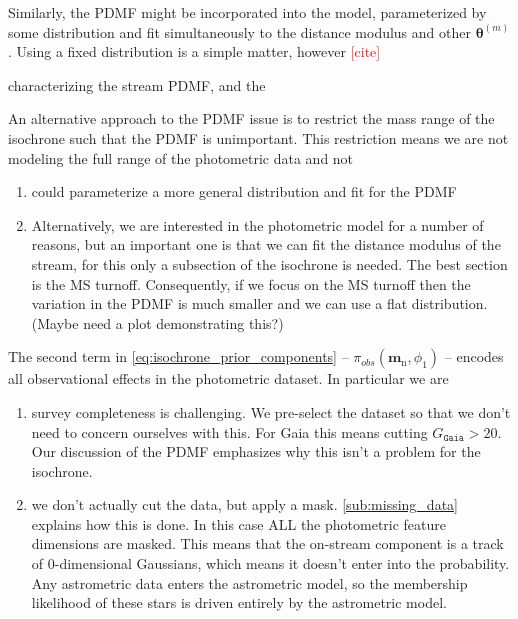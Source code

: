 \documentclass[twocolumn]{aastex631}
\newcommand{\dataarchive}[1]{\texttt{#1}}
\newcommand{\Gaia}{\dataarchive{Gaia}}
\newcommand{\mrm}[1]{\mathrm{#1}}
\newcommand{\mbs}[1]{\boldsymbol{#1}}
\newcommand{\mcal}[1]{\mathcal{#1}}
\newcommand{\prior}{\mcal{\pi}}
\newcommand{\nth}[1]{{#1}_{\mrm{n}}}  %
\newcommand{\smallcomponent}[2]{#2^{\scriptscriptstyle (#1)}}
\newcommand{\cmp}[2]{\smallcomponent{#1}{#2}}
\newcommand{\TODO}[1]{{\textcolor{red}{#1}}}
\begin{document}
            Similarly, the PDMF might be incorporated into the model,
            parameterized by some distribution and fit simultaneously to the distance modulus and other $\cmp{m}{\mbs{\theta}}$.
            Using a fixed distribution is a simple matter, however 
            \TODO{[cite]}
            
            characterizing the stream PDMF, and the 

            An alternative approach to the PDMF issue is to restrict the mass range of the isochrone such that the PDMF is unimportant.
            This restriction means we are not modeling the full range of the 
            photometric data and not

            \begin{enumerate}
                \item could parameterize a more general distribution and fit for the PDMF
                \item Alternatively, we are interested in the photometric model for a number of reasons, but an important one is that we can fit the distance modulus of the stream, for this only a subsection of the isochrone is needed. The best section is the MS turnoff.
                Consequently, if we focus on the MS turnoff then the variation in the PDMF is much smaller and we can use a flat distribution. (Maybe need a plot demonstrating this?)
            \end{enumerate}

            The second term in \autoref{eq:isochrone_prior_components} -- $\prior_{obs}(\nth{\mbs{m}}, \phi_1)$ -- encodes all observational effects in the photometric dataset. In particular we are
 
            \todo[inline]{discussion of the $\prior_{obs}(\nth{\mbs{m}}, \phi_1)$}

            \begin{enumerate}
                \item survey completeness is challenging. We pre-select the dataset so that we don't need to concern ourselves with this. For Gaia this means cutting $G_{ \Gaia} > 20$. Our discussion of the PDMF emphasizes why this isn't a problem for the isochrone.
                \item we don't actually cut the data, but apply a mask. \autoref{sub:missing_data} explains how this is done. In this case ALL the photometric feature dimensions are masked. This means that the on-stream component is a track of 0-dimensional Gaussians, which means it doesn't enter into the probability. Any astrometric data enters the astrometric model, so the membership likelihood of these stars is driven entirely by the astrometric model.
            \end{enumerate}
\end{document}
